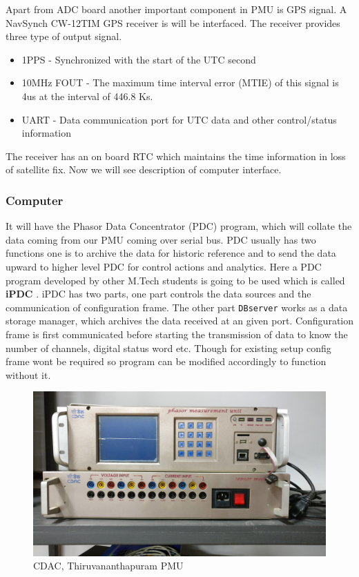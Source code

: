 Apart from ADC board another important component in PMU is GPS signal. A NavSynch CW-12TIM GPS receiver is will be interfaced. The receiver provides three type of output signal.
\begin{itemize}
\item 1PPS - Synchronized with the start of the UTC second
\item 10MHz FOUT - The maximum time interval error (MTIE) of this signal is 4us at the interval of 446.8 Ks.
\item UART - Data communication port for UTC data and other control/status information
\end{itemize}
The receiver has an on board RTC which maintains the time information in loss of satellite fix. Now we will see description of computer interface.

\subsubsection{Computer}
It will have the Phasor Data Concentrator (PDC) program, which will collate the data coming from our PMU coming over serial bus. PDC  usually has two functions one is to archive the data for historic reference and to send the data upward to higher level PDC for control actions and analytics. Here a PDC program developed by other M.Tech students is going to be used which is called \textbf{iPDC} \cite{site:ipdc}. iPDC has two parts, one part controls the data sources and the communication of configuration frame. The other part \texttt{DBserver} works as a data storage manager, which archives the data received at an given port. Configuration frame is first communicated before starting the transmission of data to know the number of channels, digital status word etc.
Though for existing setup config frame wont be required so program can be modified accordingly to function without it.

\begin{figure}[t]
\includegraphics[width=\textwidth]{fig/cdac_pmu.jpg}
\caption{CDAC, Thiruvananthapuram PMU}
\label{fig:cdac_pmu}
\end{figure}
